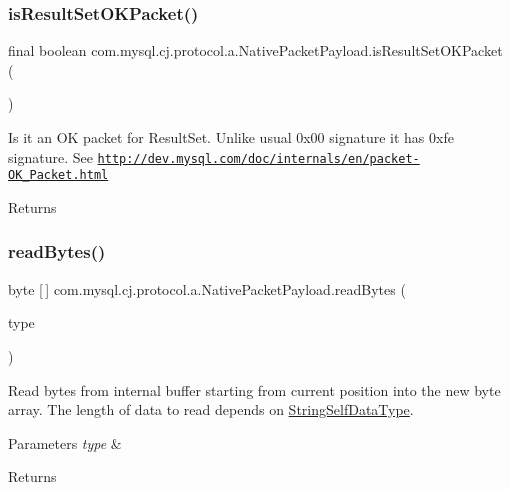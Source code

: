 \subsubsection{\texorpdfstring{is\+Result\+Set\+O\+K\+Packet()}{isResultSetOKPacket()}}
{\footnotesize\ttfamily final boolean com.\+mysql.\+cj.\+protocol.\+a.\+Native\+Packet\+Payload.\+is\+Result\+Set\+O\+K\+Packet (\begin{DoxyParamCaption}{ }\end{DoxyParamCaption})}

Is it an OK packet for Result\+Set. Unlike usual 0x00 signature it has 0xfe signature. See \href{http://dev.mysql.com/doc/internals/en/packet-OK_Packet.html}{\tt http\+://dev.\+mysql.\+com/doc/internals/en/packet-\/\+O\+K\+\_\+\+Packet.\+html}

\begin{DoxyReturn}{Returns}

\end{DoxyReturn}
\mbox{\label{classcom_1_1mysql_1_1cj_1_1protocol_1_1a_1_1_native_packet_payload_a58481f149631e0df20f8070d086dc7a1}} 
\subsubsection{\texorpdfstring{read\+Bytes()}{readBytes()}\hspace{0.1cm}{\footnotesize\ttfamily [1/2]}}
{\footnotesize\ttfamily byte \mbox{[}$\,$\mbox{]} com.\+mysql.\+cj.\+protocol.\+a.\+Native\+Packet\+Payload.\+read\+Bytes (\begin{DoxyParamCaption}\item[{String\+Self\+Data\+Type}]{type }\end{DoxyParamCaption})}

Read bytes from internal buffer starting from current position into the new byte array. The length of data to read depends on \mbox{\hyperlink{}{String\+Self\+Data\+Type}}.


\begin{DoxyParams}{Parameters}
{\em type} & \\
\hline
\end{DoxyParams}
\begin{DoxyReturn}{Returns}

\end{DoxyReturn}
\mbox{\label{classcom_1_1mysql_1_1cj_1_1protocol_1_1a_1_1_native_packet_payload_a11abcbc7ccdaa3c84eb67d2b7f194270}} 
